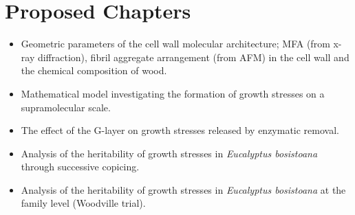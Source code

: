 \section{Proposed Chapters}
\begin{itemize}
\item Geometric parameters of the cell wall molecular architecture; MFA (from x-ray
diffraction), fibril aggregate arrangement (from AFM) in the  cell wall and the
chemical composition of wood.
\end{itemize}

\begin{itemize}
\item Mathematical model investigating the formation of growth stresses on a
supramolecular scale.
\end{itemize}

\begin{itemize}
\item The effect of the G-layer on growth stresses released by enzymatic removal.
\end{itemize}
\begin{itemize}
\item Analysis of the heritability of growth stresses in \textit{Eucalyptus bosistoana} through
successive copicing.
\end{itemize}

\begin{itemize}
\item Analysis of the heritability of growth stresses in \textit{Eucalyptus bosistoana} at the
family level (Woodville trial).
\end{itemize}
